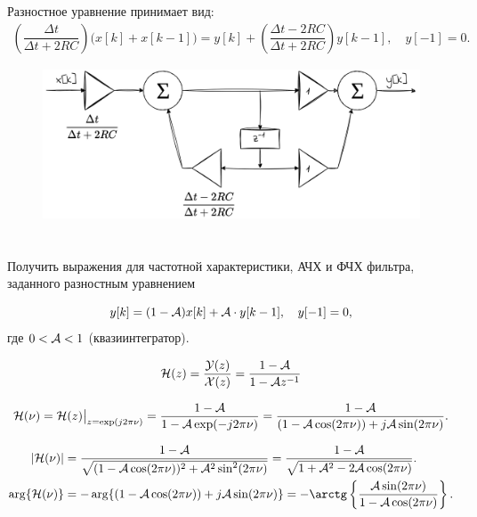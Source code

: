 Разностное уравнение принимает вид:
\begin{align*}
	\left( \dfrac{\Delta t}{\Delta t + 2RC}\right) \big(x[k] + x[k-1]\big) = y[k] + \left( \dfrac{\Delta t - 2RC}{\Delta t + 2RC}\right) y[k-1], \quad y[-1] = 0.
\end{align*}


\begin{figure}[!h]
	\centering
	\includegraphics[width=0.75\columnwidth]{pics/fall/11/11-2.png}
	\label{fig:11-2}
\end{figure}


\newpage
\section{}
Получить выражения для частотной характеристики, АЧХ и ФЧХ фильтра, заданного разностным уравнением

\begin{equation*}
	y[k] = (1 - \mathcal{A})x[k] + \mathcal{A}\cdot y[k-1],\quad y[-1] = 0,
\end{equation*}
где $0 < \mathcal{A} < 1$ (квазиинтегратор).



\begin{equation*}
	\mathcal{H}(z) = \dfrac{\mathcal{Y}(z)}{\mathcal{X}(z)} = \dfrac{1 - \mathcal{A}}{1 - \mathcal{A}z^{-1}}
\end{equation*}

\begin{equation*}
	\mathcal{H}(\nu) = \mathcal{H}(z)\big|_{z = \exp(j 2\pi \nu)} = \dfrac{1 - \mathcal{A}}{1 - \mathcal{A}\exp(-j 2\pi \nu)} =
	\dfrac{1 - \mathcal{A}}{(1 - \mathcal{A}\cos(2\pi \nu)) + j \mathcal{A} \sin(2\pi \nu)}.
\end{equation*}

\begin{align*}
	|\Capit{H}(\nu)| &= \dfrac{1 - \Capit{A}}{\sqrt{(1 - \Capit{A}\cos(2\pi \nu))^2 + \Capit{A}^2 \sin^2(2\pi \nu)}} = \dfrac{1 - \Capit{A}}{\sqrt{1  + \Capit{A}^2- 2\Capit{A}\cos(2\pi \nu)}}.\\
	\arg\{\Capit{H}(\nu)\} &= - \arg \{(1 - \Capit{A}\cos(2\pi \nu)) + j \Capit{A} \sin(2\pi \nu)\} =
	-\arctg \left\{ \dfrac{\Capit{A}\sin(2\pi \nu)}{1 - \Capit{A}\cos(2\pi \nu)}\right\}.
\end{align*}
